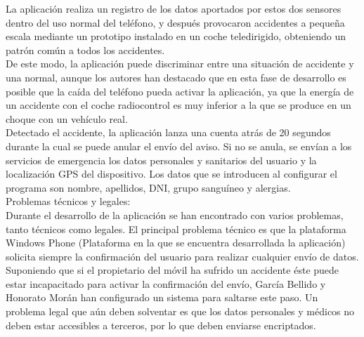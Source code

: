 La aplicación realiza un registro de los datos aportados por estos dos sensores dentro del uso normal del teléfono, y después provocaron accidentes a pequeña escala mediante un prototipo instalado en un coche teledirigido, obteniendo un patrón común a todos los accidentes. \\

De este modo, la aplicación puede discriminar entre una situación de accidente y una normal, aunque los autores han destacado que en esta fase de desarrollo es posible que la caída del teléfono pueda activar la aplicación, ya que la energía de un accidente con el coche radiocontrol es muy inferior a la que se produce en un choque con un vehículo real. \\

Detectado el accidente, la aplicación lanza una cuenta atrás de 20 segundos durante la cual se puede anular el envío del aviso. Si no se anula, se envían a los servicios de emergencia los datos personales y sanitarios del usuario y la localización GPS del dispositivo. Los datos que se introducen al configurar el programa son nombre, apellidos, DNI, grupo sanguíneo y alergias.\\

Problemas técnicos y legales:\\

Durante el desarrollo de la aplicación se han encontrado con varios problemas, tanto técnicos como legales. El principal problema técnico es que la plataforma Windows Phone (Plataforma en la que se encuentra desarrollada la aplicación) solicita siempre la confirmación del usuario para realizar cualquier envío de datos. Suponiendo que si el propietario del móvil ha sufrido un accidente éste puede estar incapacitado para activar la confirmación del envío, García Bellido y Honorato Morán han configurado un sistema para saltarse este paso. Un problema legal que aún deben solventar es que los datos personales y médicos no deben estar accesibles a terceros, por lo que deben enviarse encriptados.


